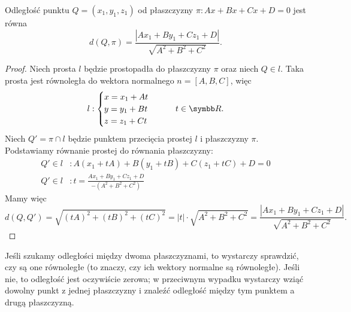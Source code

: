 \begin{theorem}
    \label{t:distance between point and plane}
    Odległość punktu $Q = (x_1, y_1, z_1)$ od płaszczyzny $\pi : Ax + Bx + Cx + D = 0$ jest równa
    \[ d(Q, \pi) = \frac{|Ax_1 + By_1 + Cz_1 + D|}{\sqrt{A^2 + B^2 + C^2}}. \]
\end{theorem}
\begin{proof}
    Niech prosta $l$ będzie prostopadła do płaszczyzny $\pi$ oraz niech $Q \in l$. Taka prosta jest równoległa do wektora normalnego $n = [A, B, C]$, więc
    \[ l : \begin{cases}
        x = x_1 + At \\
        y = y_1 + Bt \\
        z = z_1 + Ct
    \end{cases} \qquad t \in \RR. \]
    Niech $Q' = \pi \cap l$ będzie punktem przecięcia prostej $l$ i płaszczyzny $\pi$. Podstawiamy równanie prostej do równania płaszczyzny:
    \begin{align*}
        Q' \in l &: A(x_1 + tA) + B(y_1 + tB) + C(z_1 + tC) + D = 0 \\
        Q' \in l &: t = \frac{Ax_1 + By_1 + Cz_1 + D}{-(A^2 + B^2 + C^2)}
    \end{align*}
    Mamy więc
    \[ d(Q, Q') = \sqrt{(tA)^2 + (tB)^2 + (tC)^2} = |t| \cdot \sqrt{A^2 + B^2 + C^2} = \frac{|Ax_1 + By_1 + Cz_1 + D|}{\sqrt{A^2 + B^2 + C^2}}. \]
\end{proof}

Jeśli szukamy odległości między dwoma płaszczyznami, to wystarczy sprawdzić, czy są one równoległe (to znaczy, czy ich wektory normalne są równoległe). Jeśli nie, to odległość jest oczywiście zerowa; w przeciwnym wypadku wystarczy wziąć dowolny punkt z jednej płaszczyzny i znaleźć odległość między tym punktem a drugą płaszczyzną.


